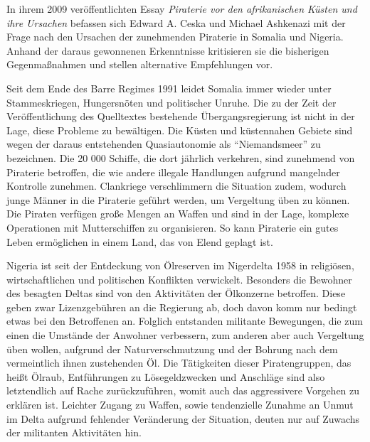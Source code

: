 \documentclass[a4paper, 12pt]{article}
\begin{document}
\begin{onehalfspace} 


\noindent In ihrem 2009 veröffentlichten Essay \emph{Piraterie vor den afrikanischen Küsten und ihre Ursachen} befassen sich Edward A. Ceska und Michael Ashkenazi mit der Frage nach den Ursachen der zunehmenden Piraterie in Somalia und Nigeria. Anhand der daraus gewonnenen Erkenntnisse kritisieren sie die bisherigen Gegenmaßnahmen und stellen alternative Empfehlungen vor.


Seit dem Ende des Barre Regimes 1991 leidet Somalia immer wieder unter Stammeskriegen, Hungersnöten und politischer Unruhe. Die zu der Zeit der Veröffentlichung des Quelltextes bestehende Übergangsregierung ist nicht in der Lage, diese Probleme zu bewältigen. Die Küsten und küstennahen Gebiete sind wegen der daraus entstehenden Quasiautonomie als "`Niemandsmeer"' zu bezeichnen. Die 20 000 Schiffe, die dort jährlich verkehren, sind zunehmend von Piraterie betroffen, die wie andere illegale Handlungen aufgrund mangelnder Kontrolle zunehmen. Clankriege verschlimmern die Situation zudem, wodurch junge Männer in die Piraterie geführt werden, um Vergeltung üben zu können. Die Piraten verfügen große Mengen an Waffen und sind in der Lage, komplexe Operationen mit Mutterschiffen zu organisieren. So kann Piraterie ein gutes Leben ermöglichen in einem Land, das von Elend geplagt ist. 


Nigeria ist seit der Entdeckung von Ölreserven im Nigerdelta 1958 in religiösen, wirtschaftlichen und politischen Konflikten verwickelt. Besonders die Bewohner des besagten Deltas sind von den Aktivitäten der Ölkonzerne betroffen. Diese geben zwar Lizenzgebühren an die Regierung ab, doch davon komm nur bedingt etwas bei den Betroffenen an. Folglich entstanden militante Bewegungen, die zum einen die Umstände der Anwohner verbessern, zum anderen aber auch Vergeltung üben wollen, aufgrund der Naturverschmutzung und der Bohrung nach dem vermeintlich ihnen zustehenden Öl. Die Tätigkeiten dieser Piratengruppen, das heißt Ölraub, Entführungen zu Lösegeldzwecken und Anschläge sind also letztendlich auf Rache zurückzuführen, womit auch das aggressivere Vorgehen zu erklären ist. Leichter Zugang zu Waffen, sowie tendenzielle Zunahme an Unmut im Delta aufgrund fehlender Veränderung der Situation, deuten nur auf Zuwachs der militanten Aktivitäten hin. 



\end{onehalfspace}
\end{document}

